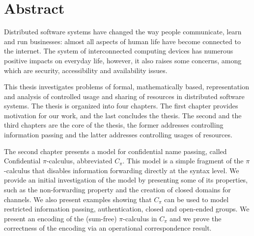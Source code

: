 \chapter*{Abstract}


Distributed software systems have changed the way people communicate, 
learn and run businesses: almost all aspects of human life have become connected to the internet.
The system of interconnected computing devices has numerous positive impacts on everyday life, however, it also raises some concerns, among which are security, accessibility and availability issues.

This thesis investigates problems of formal, mathematically based, representation and analysis of controlled usage and sharing of resources in distributed software systems.
The thesis is organized into four chapters. The first chapter provides motivation for our work, and the last concludes the thesis. The second and the third chapters are the core of the thesis, the former addresses controlling information passing and the latter addresses controlling usages of resources.

The second chapter presents a model for confidential name passing, called Confidential $\pi$-calculus, abbreviated $C_\pi$. This model is a simple fragment of the $\pi$-calculus that disables information forwarding directly at the syntax level. %
We provide an initial investigation of the model by presenting some of its properties, such as the non-forwarding property and  the creation of closed domains for channels. We also present examples showing that $C_\pi$ can be used to model restricted information passing, authentication, closed and open-ended groups.
We present an encoding of the (sum-free) $\pi$-calculus in $C_\pi$ and we prove the correctness of the encoding via an operational correspondence result. %

